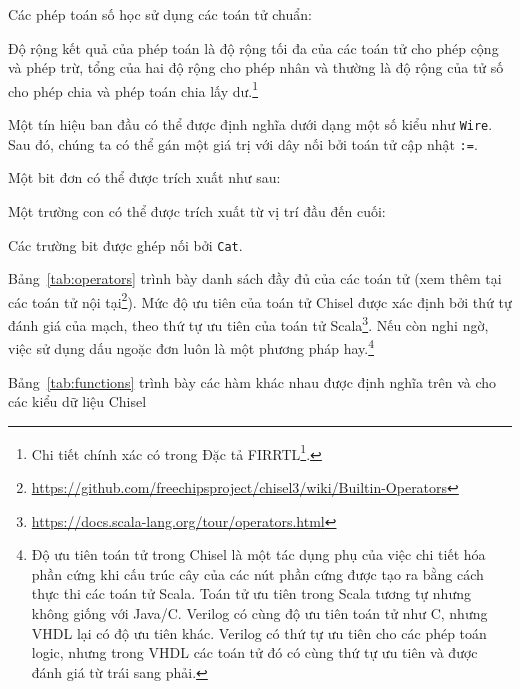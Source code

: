 \documentclass[%
    10pt,
    headinclude, footexclude,
    openright, %
    notitlepage,
    cleardoubleempty,
    headsepline,
    pointlessnumbers,
    bibtotoc, idxtotoc,
    ]{scrbook}
\newcommand{\code}[1]{{\small{\texttt{#1}}}}
\newcommand{\myref}[2]{\href{#1}{#2}}
\renewcommand{\myref}[2]{{#2}{\footnote{\url{#1}}}}
\begin{document}


\noindent Các phép toán số học sử dụng các toán tử chuẩn:



\noindent Độ rộng kết quả của phép toán là độ rộng tối đa của các toán tử cho phép cộng và phép trừ, 
tổng của hai độ rộng cho phép nhân và thường là độ rộng của tử số cho phép chia và phép toán chia lấy dư.\footnote{Chi tiết 
chính xác có trong \myref{https://github.com/freechipsproject/firrtl/blob/master/spec/spec.pdf}{Đặc tả FIRRTL}.}

Một tín hiệu ban đầu có thể được định nghĩa dưới dạng một số kiểu như \code{Wire}. Sau đó, chúng ta có thể gán
một giá trị với dây nối bởi toán tử cập nhật \code{:=}.


Một bit đơn có thể được trích xuất như sau:

\noindent Một trường con có thể được trích xuất từ vị trí đầu đến cuối:

\noindent Các trường bit được ghép nối bởi \code{Cat}.

Bảng~\ref{tab:operators} trình bày danh sách đầy đủ của các toán tử
(xem thêm tại \myref{https://github.com/freechipsproject/chisel3/wiki/Builtin-Operators}{các toán tử nội tại}).
Mức độ ưu tiên của toán tử Chisel được xác định bởi thứ tự đánh giá của mạch, 
theo \myref{https://docs.scala-lang.org/tour/operators.html}{thứ tự ưu tiên của toán tử Scala}.
Nếu còn nghi ngờ, việc sử dụng dấu ngoặc đơn luôn là một phương pháp hay.\footnote{Độ ưu tiên toán tử trong Chisel
là một tác dụng phụ của việc chi tiết hóa phần cứng khi cấu trúc cây của các nút phần cứng 
được tạo ra bằng cách thực thi các toán tử Scala. Toán tử ưu tiên trong Scala tương tự nhưng không giống với Java/C. 
Verilog có cùng độ ưu tiên toán tử như C, nhưng VHDL lại có độ ưu tiên khác. Verilog có thứ tự ưu tiên cho các phép toán logic, 
nhưng trong VHDL các toán tử đó có cùng thứ tự ưu tiên và được đánh giá từ trái sang phải.}

Bảng~\ref{tab:functions} trình bày các hàm khác nhau được định nghĩa trên và cho các kiểu dữ liệu Chisel
\end{document}
